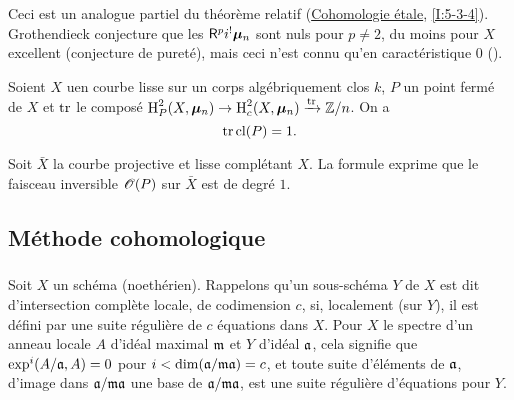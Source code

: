 Ceci est un analogue partiel du th\'eor\`eme relatif 
(\hyperref[I]{Cohomologie \'etale}, \ref{I:5-3-4}). Grothendieck conjecture 
que les $\mathsf{R}^p i^! {\bm\mu}_n$ sont nuls pour $p\ne 2$, du moins pour $X$ excellent 
(conjecture de puret\'e), mais ceci n'est connu qu'en caract\'eristique $0$ 
(\cite[XIX]{sga4}). 




\begin{theorem}\label{IV:2-1-5}
Soient $X$ uen courbe lisse sur un corps alg\'ebriquement clos $k$, $P$ un 
point ferm\'e de $X$ et $\operatorname{tr}$ le compos\'e $\operatorname{H}_P^2(X,{\bm\mu}_n) \to \operatorname{H}_c^2(X,{\bm\mu}_n) \xrightarrow{\operatorname{tr}} \mathbb{Z}/n$. On a 
\[
  \operatorname{tr} \operatorname{cl}(P) = 1 \text{.}
\]
\end{theorem}

Soit $\bar X$ la courbe projective et lisse compl\'etant $X$. La formule 
exprime que le faisceau inversible $\mathscr{O}(P)$ sur $\bar X$ est de degr\'e $1$. 










\subsection{M\'ethode cohomologique}\label{IV:2-2}





\subsubsection{}\label{IV:2-2-1}

Soit $X$ un sch\'ema (noeth\'erien). Rappelons qu'un sous-sch\'ema $Y$ de $X$ 
est dit d'intersection compl\`ete locale, de codimension $c$, si, localement 
(sur $Y$), il est d\'efini par une suite r\'eguli\`ere de $c$ \'equations dans 
$X$. Pour $X$ le spectre d'un anneau locale $A$ d'id\'eal maximal $\mathfrak{m}$ et 
$Y$ d'id\'eal $\mathfrak{a}$, cela signifie que $\exp^i(A/\mathfrak{a},A) = 0$ pour 
$i<\dim(\mathfrak{a}/\mathfrak{m}\mathfrak{a})=c$, et toute suite d'\'el\'ements de $\mathfrak{a}$, d'image dans 
$\mathfrak{a}/\mathfrak{m}\mathfrak{a}$ une base de $\mathfrak{a}/\mathfrak{m}\mathfrak{a}$, est une suite r\'eguli\`ere 
d'\'equations pour $Y$. 





\subsubsection{}\label{IV:2-2-2}


